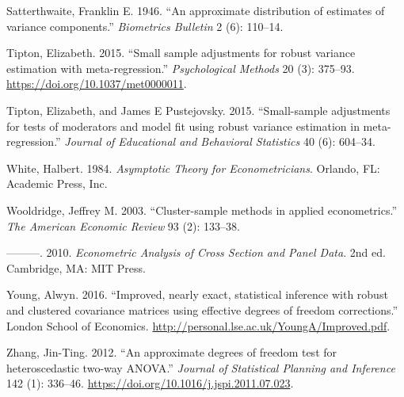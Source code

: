 \documentclass[12pt]{article}
\newlength{\cslhangindent}
\newlength{\cslentryspacingunit} %
\newenvironment{CSLReferences}[2] %
 {%
  \setlength{\parindent}{0pt}
  \ifodd #1
  \let\oldpar\par
  \def\par{\hangindent=\cslhangindent\oldpar}
  \fi
  \setlength{\parskip}{#2\cslentryspacingunit}
 }%
 {}
\begin{document}
\begin{CSLReferences}{1}{0}
\leavevmode{}%
Satterthwaite, Franklin E. 1946. {``{An approximate distribution of
estimates of variance components}.''} \emph{Biometrics Bulletin} 2 (6):
110--14.

\leavevmode{}%
Tipton, Elizabeth. 2015. {``{Small sample adjustments for robust
variance estimation with meta-regression.}''} \emph{Psychological
Methods} 20 (3): 375--93. \url{https://doi.org/10.1037/met0000011}.

\leavevmode{}%
Tipton, Elizabeth, and James E Pustejovsky. 2015. {``{Small-sample
adjustments for tests of moderators and model fit using robust variance
estimation in meta-regression}.''} \emph{Journal of Educational and
Behavioral Statistics} 40 (6): 604--34.

\leavevmode{}%
White, Halbert. 1984. \emph{Asymptotic Theory for Econometricians}.
Orlando, FL: Academic Press, Inc.

\leavevmode{}%
Wooldridge, Jeffrey M. 2003. {``{Cluster-sample methods in applied
econometrics}.''} \emph{The American Economic Review} 93 (2): 133--38.

\leavevmode{}%
---------. 2010. \emph{{Econometric Analysis of Cross Section and Panel
Data}}. 2nd ed. Cambridge, MA: MIT Press.

\leavevmode{}%
Young, Alwyn. 2016. {``{Improved, nearly exact, statistical inference
with robust and clustered covariance matrices using effective degrees of
freedom corrections}.''} London School of Economics.
\url{http://personal.lse.ac.uk/YoungA/Improved.pdf}.

\leavevmode{}%
Zhang, Jin-Ting. 2012. {``{An approximate degrees of freedom test for
heteroscedastic two-way ANOVA}.''} \emph{Journal of Statistical Planning
and Inference} 142 (1): 336--46.
\url{https://doi.org/10.1016/j.jspi.2011.07.023}.

\end{CSLReferences}

\newpage

\renewcommand{\thesection}{Appendix \Alph{section}}
\renewcommand{\thesubsection}{\Alph{section}.\arabic{subsection}}
\setcounter{section}{0}
\setcounter{table}{0}
\setcounter{figure}{0}
\setcounter{equation}{0}
\renewcommand{\thefigure}{A\arabic{figure}}
\renewcommand{\thetable}{A\arabic{table}}
\renewcommand{\theequation}{A\arabic{equation}}
\end{document}
